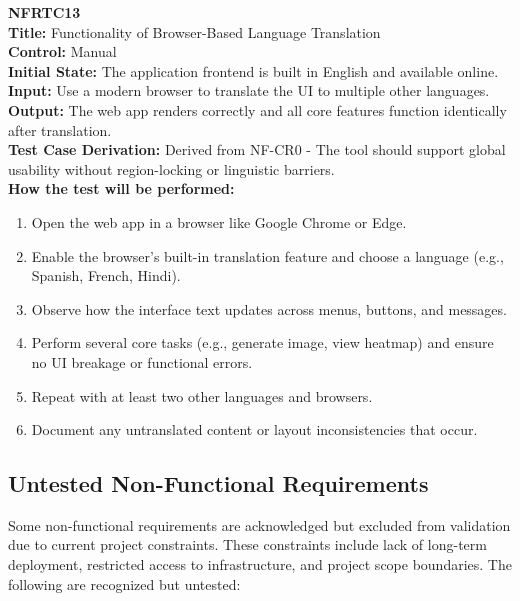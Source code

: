 \documentclass[12pt, titlepage]{article}
\begin{document}
\textbf{NFRTC13}\\
\textbf{Title:} Functionality of Browser-Based Language Translation\\
\textbf{Control:} Manual\\
\textbf{Initial State:} The application frontend is built in English and available online.\\
\textbf{Input:} Use a modern browser to translate the UI to multiple other languages.\\
\textbf{Output:} The web app renders correctly and all core features function identically after translation.\\
\textbf{Test Case Derivation:} Derived from NF-CR0 - The tool should support global usability without region-locking or linguistic barriers.\\
\textbf{How the test will be performed:}
\begin{enumerate}
  \item Open the web app in a browser like Google Chrome or Edge.
  \item Enable the browser's built-in translation feature and choose a language (e.g., Spanish, French, Hindi).
  \item Observe how the interface text updates across menus, buttons, and messages.
  \item Perform several core tasks (e.g., generate image, view heatmap) and ensure no UI breakage or functional errors.
  \item Repeat with at least two other languages and browsers.
  \item Document any untranslated content or layout inconsistencies that occur.
\end{enumerate}
\vspace{1em}

\subsection{Untested Non-Functional Requirements}


Some non-functional requirements are acknowledged but excluded from validation due to current project constraints. These constraints include lack of long-term deployment, restricted access to infrastructure, and project scope boundaries. The following are recognized but untested:
\end{document}
